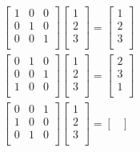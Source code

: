 \documentclass{article}
\begin{document}
\begin{equation*}
    \begin{split}
        &\begin{bmatrix}
            1&0&0\\
            0&1&0\\
            0&0&1\\
        \end{bmatrix}\begin{bmatrix}
            1\\
            2\\
            3\\
        \end{bmatrix}=\begin{bmatrix}
            1\\
            2\\
            3\\
        \end{bmatrix}\\
        &\begin{bmatrix}
            0&1&0\\
            0&0&1\\
            1&0&0\\
        \end{bmatrix}\begin{bmatrix}
            1\\
            2\\
            3\\
        \end{bmatrix}=\begin{bmatrix}
            2\\
            3\\
            1\\
        \end{bmatrix}\\
        &\begin{bmatrix}
            0&0&1\\
            1&0&0\\
            0&1&0\\
        \end{bmatrix}\begin{bmatrix}
            1\\
            2\\
            3\\
        \end{bmatrix}=\begin{bmatrix}

\end{bmatrix}
\end{split}
\end{equation*}
\end{document}
